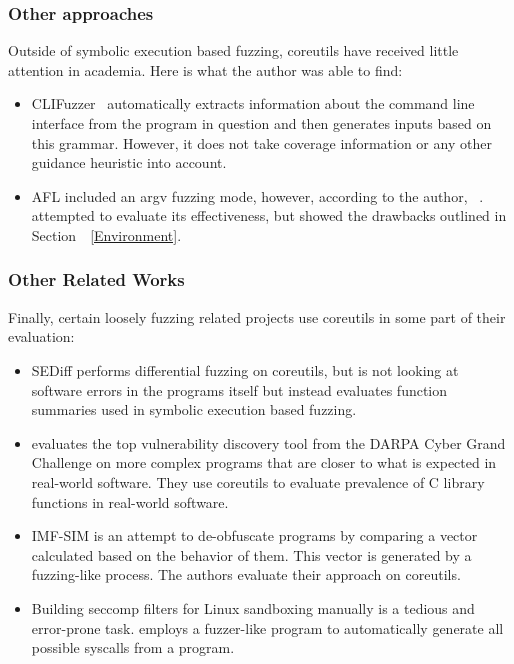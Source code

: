 \documentclass{article}
\let\savedCite=\cite
\renewcommand{\cite}{\unskip~\savedCite}
\let\savedRef=\ref
\renewcommand{\ref}{\unskip~\savedRef}
\begin{document}
\begin{multicols}{2}
    \subsubsection{Other approaches}

    Outside of symbolic execution based fuzzing, coreutils have received little attention in academia. Here is what the author was able to find:

    \begin{itemize}
        \item CLIFuzzer\cite{CLIFuzzer} automatically extracts information about the command line interface from the program in question and then generates inputs based on this grammar. However, it does not take coverage information or any other guidance heuristic into account.
        \item AFL included an argv fuzzing mode, however, according to the author, \cite{AFLPlusPlusargv}. \citeauthor{AFLCoreutils} attempted to evaluate its effectiveness, but showed the drawbacks outlined in Section~\ref{Environment}.\cite{AFLCoreutils}
    \end{itemize}

    \subsubsection{Other Related Works}

    Finally, certain loosely fuzzing related projects use coreutils in some part of their evaluation:

    \begin{itemize}
        \item SEDiff performs differential fuzzing on coreutils, but is not looking at software errors in the programs itself but instead evaluates function summaries used in symbolic execution based fuzzing.\cite{SEDiff}
        \item \citeauthor{DarpaExtended} evaluates the top vulnerability discovery tool from the DARPA Cyber Grand Challenge on more complex programs that are closer to what is expected in real-world software. They use coreutils to evaluate prevalence of C library functions in real-world software.\cite{DarpaExtended}
        \item IMF-SIM is an attempt to de-obfuscate programs by comparing a vector calculated based on the behavior of them. This vector is generated by a fuzzing-like process. The authors evaluate their approach on coreutils.\cite{IMF-SIM}
        \item Building seccomp filters for Linux sandboxing manually is a tedious and error-prone task. \citeauthor{Seccomp} employs a fuzzer-like program to automatically generate all possible syscalls from a program.\cite{Seccomp}
    \end{itemize}


\end{multicols}
\end{document}
